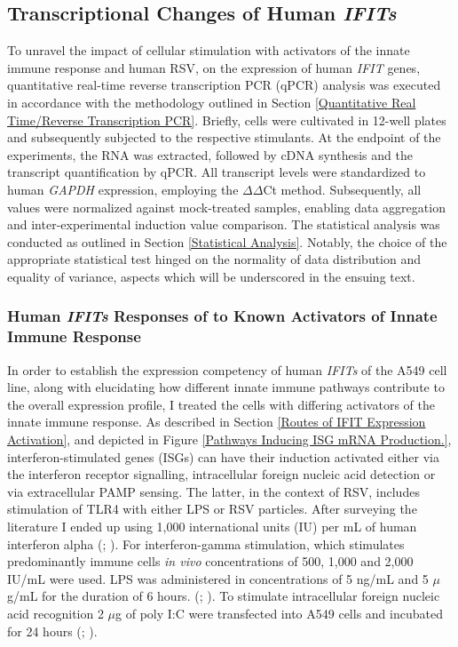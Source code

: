 \subsection{Transcriptional Changes of Human \textit{IFITs}} \label{Transcriptional Changes of Human IFITs}
To unravel the impact of cellular stimulation with activators of the innate immune response and human RSV, on the expression of human \textit{IFIT} genes, quantitative real-time reverse transcription PCR (qPCR) analysis was executed in accordance with the methodology outlined in Section \ref{Quantitative Real Time/Reverse Transcription PCR}. Briefly, cells were cultivated in 12-well plates and subsequently subjected to the respective stimulants. At the endpoint of the experiments, the RNA was extracted, followed by cDNA synthesis and the transcript quantification by qPCR. All transcript levels were standardized to human \textit{GAPDH} expression, employing  the 
\(\Delta\)\(\Delta\)Ct method. Subsequently, all values were normalized against mock-treated samples, enabling data aggregation and inter-experimental induction value comparison. The statistical analysis was conducted as outlined in Section \ref{Statistical Analysis}. Notably, the choice of the appropriate statistical test hinged on the normality of data distribution and equality of variance, aspects which will be underscored in the ensuing text.



\subsubsection{Human \textit{IFITs} Responses of to Known Activators of Innate Immune Response} \label{Human IFIT Responses to Known Activators of Innate Immune Response}
In order to establish the expression competency of human \textit{IFITs} of the A549 cell line, along with elucidating how different innate immune pathways contribute to the overall expression profile, I treated the cells with differing activators of the innate immune response. As described in Section \ref{Routes of IFIT Expression Activation}, and depicted in Figure \ref{Pathways Inducing ISG mRNA Production.},  interferon-stimulated genes (ISGs) can have their induction activated either via the interferon receptor signalling, intracellular foreign nucleic acid detection or via extracellular PAMP sensing. The latter, in the context of RSV, includes stimulation of TLR4 with either LPS or RSV particles. After surveying the literature I ended up using 1,000 international units (IU) per mL of human interferon alpha (\cite{Terenzi2006DistinctISG56}; \cite{Santhakumar2018ChickenViruses}). For interferon-gamma stimulation, which stimulates predominantly immune cells \textit{in vivo} concentrations of 500, 1,000 and 2,000 IU/mL were used. LPS was administered in concentrations of 5 ng/mL and 5 \(\mu\)g/mL for the duration of 6 hours. (\cite{Mears2019Ifit1Cells}; \cite{Zhang2019GrouperResponse}). To stimulate intracellular foreign nucleic acid recognition 2 \(\mu\)g of poly I:C were transfected into A549 cells and incubated for 24 hours (\cite{Mears2019Ifit1Cells}; \cite{Palchetti2015TransfectedCells}).

